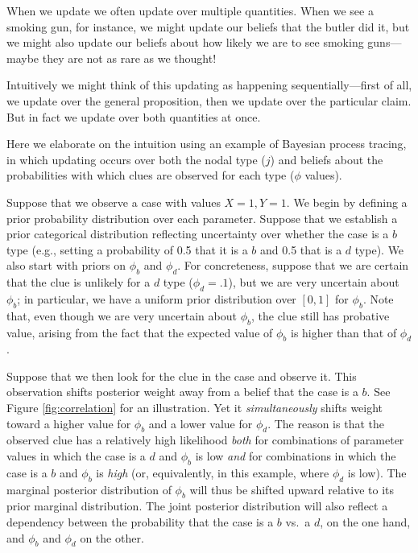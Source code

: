 \documentclass[
  12pt,
]{book}
\begin{document}
When we update we often update over multiple quantities. When we see a smoking gun, for instance, we might update our beliefs that the butler did it, but we might also update our beliefs about how likely we are to see smoking guns---maybe they are not as rare as we thought!

Intuitively we might think of this updating as happening sequentially---first of all, we update over the general proposition, then we update over the particular claim. But in fact we update over both quantities at once.

Here we elaborate on the intuition using an example of Bayesian process tracing, in which updating occurs over both the nodal type (\(j\)) and beliefs about the probabilities with which clues are observed for each type (\(\phi\) values).

Suppose that we observe a case with values \(X=1, Y=1\). We begin by defining a prior probability distribution over each parameter. Suppose that we establish a prior categorical distribution reflecting uncertainty over whether the case is a \(b\) type (e.g., setting a probability of 0.5 that it is a \(b\) and 0.5 that is a \(d\) type). We also start with priors on \(\phi_b\) and \(\phi_d\). For concreteness, suppose that we are certain that the clue is unlikely for a \(d\) type (\(\phi_d=.1\)), but we are very uncertain about \(\phi_b\); in particular, we have a uniform prior distribution over \([0,1]\) for \(\phi_b\). Note that, even though we are very uncertain about \(\phi_b\), the clue still has probative value, arising from the fact that the expected value of \(\phi_b\) is higher than that of \(\phi_d\).

Suppose that we then look for the clue in the case and observe it. This observation shifts posterior weight away from a belief that the case is a \(b\). See Figure \ref{fig:correlation} for an illustration. Yet it \emph{simultaneously} shifts weight toward a higher value for \(\phi_b\) and a lower value for \(\phi_d\). The reason is that the observed clue has a relatively high likelihood \emph{both} for combinations of parameter values in which the case is a \(d\) and \(\phi_b\) is low \emph{and} for combinations in which the case is a \(b\) and \(\phi_b\) is \emph{high} (or, equivalently, in this example, where \(\phi_d\) is low). The marginal posterior distribution of \(\phi_b\) will thus be shifted upward relative to its prior marginal distribution. The joint posterior distribution will also reflect a dependency between the probability that the case is a \(b\) vs.~a \(d\), on the one hand, and \(\phi_b\) and \(\phi_d\) on the other.
\end{document}
